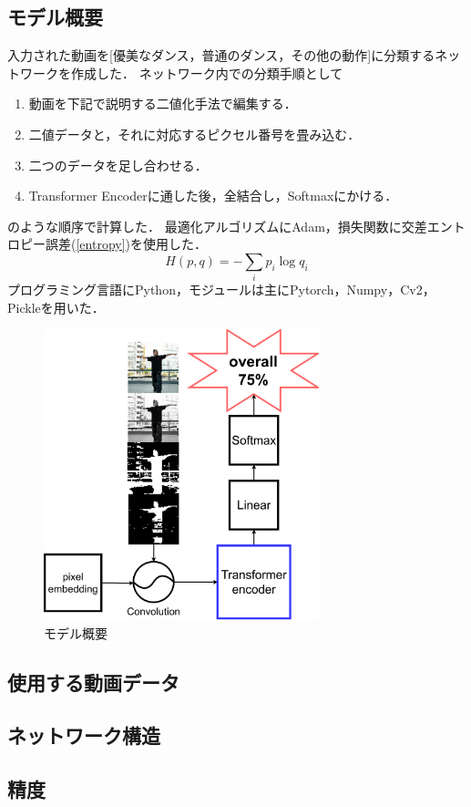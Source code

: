 \subsection{モデル概要}
入力された動画を[優美なダンス，普通のダンス，その他の動作]に分類するネットワークを作成した．
ネットワーク内での分類手順として
\begin{enumerate}
  \item 動画を下記で説明する二値化手法で編集する．
  \item 二値データと，それに対応するピクセル番号を畳み込む．
  \item 二つのデータを足し合わせる．
  \item Transformer Encoderに通した後，全結合し，Softmaxにかける．
\end{enumerate}
のような順序で計算した．
最適化アルゴリズムにAdam\cite{adam}，損失関数に交差エントロピー誤差(\ref{entropy})を使用した．
\begin{equation}
  H(p, q) = -\sum_{i}p_i\log q_i
  \label{entropy}
\end{equation}
プログラミング言語にPython，モジュールは主にPytorch，Numpy，Cv2，Pickleを用いた．

\begin{figure}[b]
  \begin{center}
   \includegraphics[width=80mm]{images/easy_chart.pdf}
  \end{center}
  \caption{モデル概要}
  \label{easy_chart}
\end{figure}

\clearpage

\subsection{使用する動画データ}

\subsection{ネットワーク構造}

\subsection{精度}